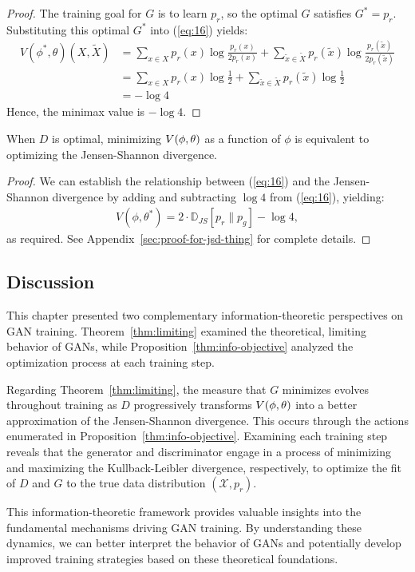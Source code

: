 \begin{proof}
	The training goal for $G$ is to learn $p_r$, so the optimal $G$ satisfies $G^* = p_r$. Substituting this optimal $G^*$ into (\ref{eq:16}) yields:
	\begin{align}
		\label{eq:side-note}
		V(\phi^*, \theta)(X, \tilde{X}) & = \sum_{x \in X}p_r(x) \log{\frac{p_r(x)}{2 p_r(x)}} + \sum_{\tilde{x} \in \tilde{X}}p_r(\tilde{x}) \log{\frac{p_r(\tilde{x})}{2 p_r(\tilde{x})}} \\
		                                & = \sum_{x \in X} p_r(x) \log {\frac{1}{2}} + \sum_{\tilde{x} \in \tilde{X}} p_r(\tilde{x}) \log {\frac{1}{2}}                                     \\
		                                & = -\log{4}
	\end{align}
	Hence, the minimax value is $-\log{4}$.
\end{proof}

\begin{theorem}%
	\label{thm:limiting}
	When $D$ is optimal, minimizing $V(\phi, \theta)$ as a function of $\phi$ is equivalent to
	optimizing the Jensen-Shannon divergence.
\end{theorem}

\begin{proof}
	We can establish the relationship between (\ref{eq:16}) and the Jensen-Shannon divergence by adding and subtracting $\log{4}$ from (\ref{eq:16}), yielding:
	\begin{align}
		\label{eq:desired}
		V(\phi, \theta^*) = 2 \cdot \mathbb{D}_{JS}[p_r \| p_g] - \log{4},
	\end{align}
	as required. See Appendix~\ref{sec:proof-for-jsd-thing} for complete details.
\end{proof}

\subsection{Discussion}

This chapter presented two complementary information-theoretic perspectives on GAN training. Theorem~\ref{thm:limiting} examined the theoretical, limiting behavior of GANs, while Proposition~\ref{thm:info-objective} analyzed the optimization process at each training step.

Regarding Theorem~\ref{thm:limiting}, the measure that $G$ minimizes evolves throughout training as $D$ progressively transforms $V(\phi, \theta)$ into a better approximation of the Jensen-Shannon divergence. This occurs through the actions enumerated in Proposition~\ref{thm:info-objective}. Examining each training step reveals that the generator and discriminator engage in a process of minimizing and maximizing the Kullback-Leibler divergence, respectively, to optimize the fit of $D$ and $G$ to the true data distribution $(\mathcal{X}, p_r)$.

This information-theoretic framework provides valuable insights into the fundamental mechanisms driving GAN training. By understanding these dynamics, we can better interpret the behavior of GANs and potentially develop improved training strategies based on these theoretical foundations.

